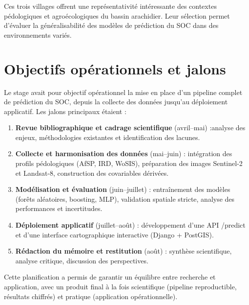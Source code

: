 \documentclass[12pt,a4paper,oneside]{report}
\begin{document}
Ces trois villages offrent une représentativité intéressante des contextes pédologiques et agroécologiques du bassin arachidier. Leur sélection permet d’évaluer la généralisabilité des modèles de prédiction du SOC dans des environnements variés.

\section{Objectifs opérationnels et jalons}
Le stage avait pour objectif opérationnel la mise en place d’un pipeline complet de prédiction du SOC, depuis la collecte des données jusqu’au déploiement applicatif. Les jalons principaux étaient :
\begin{enumerate}
  \item \textbf{Revue bibliographique et cadrage scientifique} (avril–mai) :analyse des enjeux, méthodologies existantes et identification des lacunes.
  \item \textbf{Collecte et harmonisation des données} (mai–juin) : intégration des profils pédologiques (AfSP, IRD, WoSIS), préparation des images Sentinel-2 et Landsat-8, construction des covariables dérivées.
  \item \textbf{Modélisation et évaluation} (juin–juillet) : entraînement des modèles (forêts aléatoires, boosting, MLP), validation spatiale stricte, analyse des performances et incertitudes.
  \item \textbf{Déploiement applicatif} (juillet–août) : développement d’une API /predict et d’une interface cartographique interactive (Django + PostGIS).
  \item \textbf{Rédaction du mémoire et restitution} (août) : synthèse scientifique, analyse critique, discussion des perspectives.
\end{enumerate}
Cette planification a permis de garantir un équilibre entre recherche et application, avec un produit final à la fois scientifique (pipeline reproductible, résultats chiffrés) et pratique (application opérationnelle).
\end{document}
